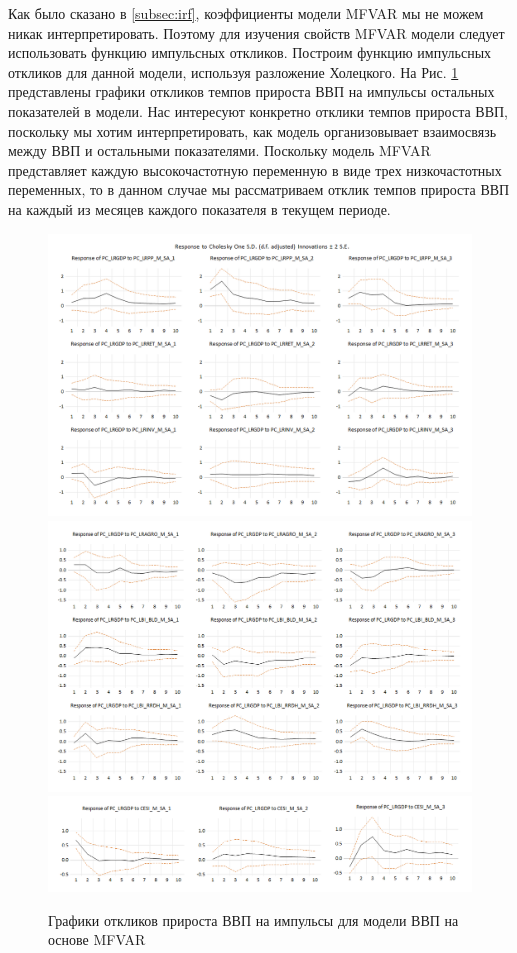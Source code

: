 \documentclass[a4paper, 14pt]{extreport}
\numberwithin{equation}{section}
\numberwithin{equation}{section}
\begin{document}
	Как было сказано в \ref{subsec:irf}, коэффициенты модели MFVAR мы не можем никак интерпретировать. Поэтому для изучения свойств MFVAR модели следует использовать функцию импульсных откликов. Построим функцию импульсных откликов для данной модели, используя разложение Холецкого. На Рис. \ref{fig:image44} представлены графики откликов темпов прироста ВВП на импульсы остальных показателей в модели. Нас интересуют конкретно отклики темпов прироста ВВП, поскольку мы хотим интерпретировать, как модель организовывает взаимосвязь между ВВП и остальными показателями. Поскольку модель MFVAR представляет каждую высокочастотную переменную в виде трех низкочастотных переменных, то в данном случае мы рассматриваем отклик темпов прироста ВВП на каждый из месяцев каждого показателя в текущем периоде.
	
	\begin{figure}
		\centering
		\includegraphics[width=\textwidth]{images/image44}\\
		\includegraphics[width=\textwidth]{images/image45}\\
		\includegraphics[width=\textwidth]{images/image46}
		\caption{Графики откликов прироста ВВП на импульсы  для модели ВВП на основе MFVAR}
		\label{fig:image44}
	\end{figure}
	
\end{document}
